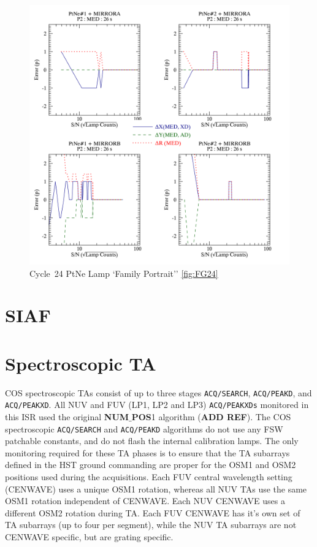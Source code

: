\documentclass[12pt]{reportj}
\newcommand{\numpos}{{\bf NUM$\_$POS}\rm}
\begin{document}
\begin{center}
\begin{figure}
\noindent\includegraphics*[width=0.795\linewidth]{png/C24_14857_Error_vs_lampSN.png}
\caption{Cycle~24 PtNe Lamp `Family Portrait'' \ref{fig:FG24}}
\end{figure}
\end{center}
\section{SIAF}
\section{Spectroscopic TA}

COS spectroscopic TAs consist of up to three stages \texttt{ACQ/SEARCH}, \texttt{ACQ/PEAKD}, and \texttt{ACQ/PEAKXD}.
All NUV and FUV (LP1, LP2 and LP3) \texttt{ACQ/PEAKXDs} monitored in this ISR used the original \numpos1 algorithm (\textbf{ADD REF}).
The COS spectroscopic \texttt{ACQ/SEARCH} and \texttt{ACQ/PEAKD} algorithms do not use any FSW patchable constants, and do not flash the
internal calibration lamps. The only monitoring required for these TA phases is to ensure that the TA subarrays defined in the
HST ground commanding are proper for the OSM1 and OSM2 positions used during the acquisitions. Each FUV central wavelength setting (CENWAVE)
uses a unique OSM1 rotation, whereas all NUV TAs use the same OSM1 rotation independent of CENWAVE. Each NUV CENWAVE uses a different
OSM2 rotation during TA. Each FUV CENWAVE has it's own set of TA subarrays (up to four per segment), while the NUV TA subarrays are not CENWAVE
specific, but are grating specific.
\end{document}
